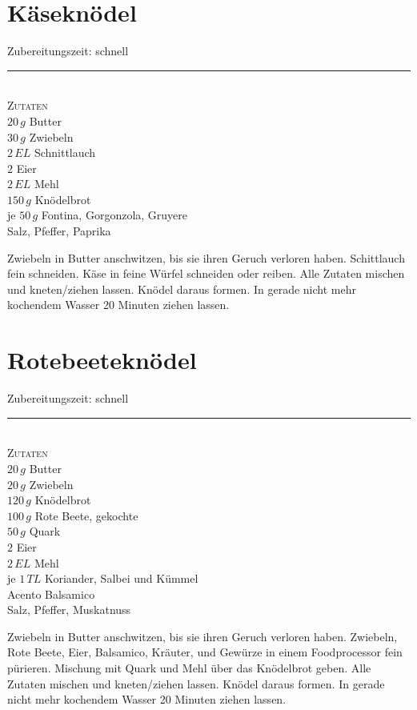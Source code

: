 \section{Käseknödel}\label{sec:kaeseknoedel}
\begin{minipage}[t]{0.3\textwidth}
    Zubereitungszeit: schnell\\
    \noindent\rule[1ex]{\textwidth}{1pt}\\
    \textsc{Zutaten}\\
    $20\,g$ Butter\\
    $30\,g$ Zwiebeln\\
    $2\,EL$ Schnittlauch\\
    $2$ Eier\\
    $2\,EL$ Mehl\\
    $150\,g$ Knödelbrot\\
    je $50\,g$ Fontina, Gorgonzola, Gruyere\\
    Salz, Pfeffer, Paprika\\
\end{minipage}
\begin{minipage}[t]{0.69\textwidth}
    Zwiebeln in Butter anschwitzen, bis sie ihren Geruch verloren haben.
    Schittlauch fein schneiden.
    Käse in feine Würfel schneiden oder reiben.
    Alle Zutaten mischen und kneten/ziehen lassen.
    Knödel daraus formen.
    In gerade nicht mehr kochendem Wasser 20 Minuten ziehen lassen.
\end{minipage}
\newpage


\section{Rotebeeteknödel}\label{sec:rotebeeteknoedel}
\begin{minipage}[t]{0.3\textwidth}
    Zubereitungszeit: schnell\\
    \noindent\rule[1ex]{\textwidth}{1pt}\\
    \textsc{Zutaten}\\
    $20\,g$ Butter\\
    $20\,g$ Zwiebeln\\
    $120\,g$ Knödelbrot\\
    $100\,g$ Rote Beete, gekochte\\
    $50\,g$ Quark\\
    $2$ Eier\\
    $2\,EL$ Mehl\\
    je $1\,TL$ Koriander, Salbei und Kümmel\\
    Acento Balsamico\\
    Salz, Pfeffer, Muskatnuss\\
\end{minipage}
\begin{minipage}[t]{0.69\textwidth}
    Zwiebeln in Butter anschwitzen, bis sie ihren Geruch verloren haben.
    Zwiebeln, Rote Beete, Eier, Balsamico, Kräuter, und Gewürze in einem Foodprocessor fein pürieren.
    Mischung mit Quark und Mehl über das Knödelbrot geben.
    Alle Zutaten mischen und kneten/ziehen lassen.
    Knödel daraus formen.
    In gerade nicht mehr kochendem Wasser 20 Minuten ziehen lassen.
\end{minipage}
\newpage